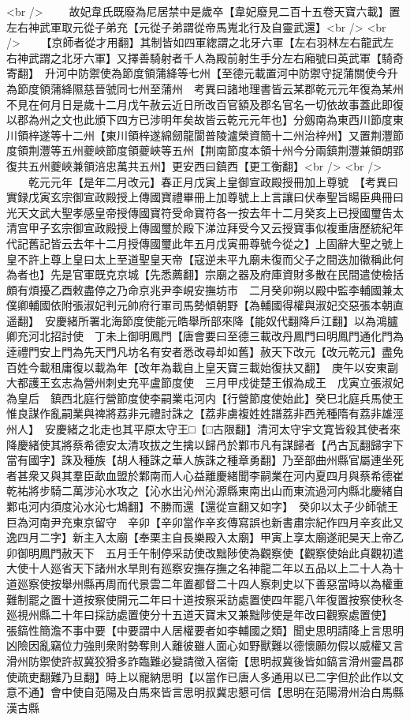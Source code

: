 <br />
　　故妃韋氏既廢為尼居禁中是歲卒【韋妃廢見二百十五卷天寶六載】置左右神武軍取元從子弟充【元從子弟謂從帝馬嵬北行及自靈武還】<br />
<br />
　　【京師者從才用翻】其制皆如四軍緫謂之北牙六軍【左右羽林左右龍武左右神武謂之北牙六軍】又擇善騎射者千人為殿前射生手分左右廂號曰英武軍【騎奇寄翻】　升河中防禦使為節度領蒲絳等七州【至德元載置河中防禦守捉蒲關使今升為節度領蒲絳隰慈晉虢同七州至蒲州　考異曰諸地理書皆云某郡乾元元年復為某州不見在何月日是歲十二月戊午赦云近日所改百官額及郡名官名一切依故事蓋此即復以郡為州之文也此頒下四方已涉明年矣故皆云乾元元年也】分劔南為東西川節度東川領梓遂等十二州【東川領梓遂綿劒龍閬普陵瀘榮資簡十二州治梓州】又置荆灃節度領荆灃等五州夔峽節度領夔峽等五州【荆南節度本領十州今分兩鎮荆灃兼領朗郢復共五州夔峽兼領涪忠萬共五州】更安西曰鎮西【更工衡翻】<br />
<br />
　　乾元元年【是年二月改元】春正月戊寅上皇御宣政殿授冊加上尊號　【考異曰實録戊寅玄宗御宣政殿授上傳國寶禮畢冊上加尊號上上言讓曰伏奉聖旨䁑臣典冊曰光天文武大聖孝感皇帝授傳國寶符受命寶符各一按去年十二月癸亥上已授國璽告太清宫甲子玄宗御宣政殿授上傳國璽於殿下涕泣拜受今又云授寶事似複重唐歷統紀年代記舊記皆云去年十二月授傳國璽此年五月戊寅冊尊號今從之】上固辭大聖之號上皇不許上尊上皇曰太上至道聖皇天帝【寇逆未平九廟未復而父子之間迭加徽稱此何為者也】先是官軍既克京城【先悉薦翻】宗廟之器及府庫資財多散在民間遣使檢括頗有煩擾乙酉敕盡停之乃命京兆尹李峴安撫坊市　二月癸卯朔以殿中監李輔國兼太僕卿輔國依附張淑妃判元帥府行軍司馬勢傾朝野【為輔國得權與淑妃交惡張本朝直遥翻】　安慶緒所署北海節度使能元皓舉所部來降【能奴代翻降戶江翻】以為鴻臚卿充河北招討使　丁未上御明鳳門【唐會要曰至德三載改丹鳳門曰明鳳門通化門為逹禮門安上門為先天門凡坊名有安者悉改尋却如舊】赦天下改元【改元乾元】盡免百姓今載租庸復以載為年【改年為載自上皇天寶三載始復扶又翻】　庚午以安東副大都護王玄志為營州刺史充平盧節度使　三月甲戍徙楚王俶為成王　戊寅立張淑妃為皇后　鎮西北庭行營節度使李嗣業屯河内【行營節度使始此】癸巳北庭兵馬使王惟良謀作亂嗣業與禆將荔非元禮討誅之【荔非虜複姓姓譜荔非西羌種隋有荔非雄涇州人】　安慶緒之北走也其平原太守王□【□古限翻】清河太守宇文寛皆殺其使者來降慶緒使其將蔡希德安太清攻拔之生擒以歸冎於鄴市凡有謀歸者【冎古瓦翻歸字下當有國字】誅及種族【胡人種誅之華人族誅之種章勇翻】乃至部曲州縣官屬連坐死者甚衆又與其羣臣歃血盟於鄴南而人心益離慶緒聞李嗣業在河内夏四月與蔡希德崔乾祐將步騎二萬涉沁水攻之【沁水出沁州沁源縣東南出山而東流過河内縣北慶緒自鄴屯河内須度沁水沁七鴆翻】不勝而還【還從宣翻又如字】　癸卯以太子少師虢王巨為河南尹充東京留守　辛卯【辛卯當作辛亥傳寫誤也新書肅宗紀作四月辛亥此又逸四月二字】新主入太廟【奉栗主自長樂殿入太廟】甲寅上享太廟遂祀昊天上帝乙卯御明鳳門赦天下　五月壬午制停采訪使改黜陟使為觀察使【觀察使始此貞觀初遣大使十人廵省天下諸州水旱則有廵察安撫存撫之名神龍二年以五品以上二十人為十道廵察使按舉州縣再周而代景雲二年置都督二十四人察刺史以下善惡當時以為權重難制罷之置十道按察使開元二年曰十道按察采訪處置使四年罷八年復置按察使秋冬廵視州縣二十年曰採訪處置使分十五道天寶末又兼黜陟使是年改曰觀察處置使】　張鎬性簡澹不事中要【中要謂中人居權要者如李輔國之類】聞史思明請降上言思明凶險因亂竊位力強則衆附勢奪則人離彼雖人面心如野獸難以德懷願勿假以威權又言滑州防禦使許叔冀狡猾多詐臨難必變請徵入宿衛【思明叔冀後皆如鎬言滑州靈昌郡使疏吏翻難乃旦翻】時上以寵納思明【以當作已唐人多通用以已二字但於此作以文意不通】會中使自范陽及白馬來皆言思明叔冀忠懇可信【思明在范陽滑州治白馬縣漢古縣